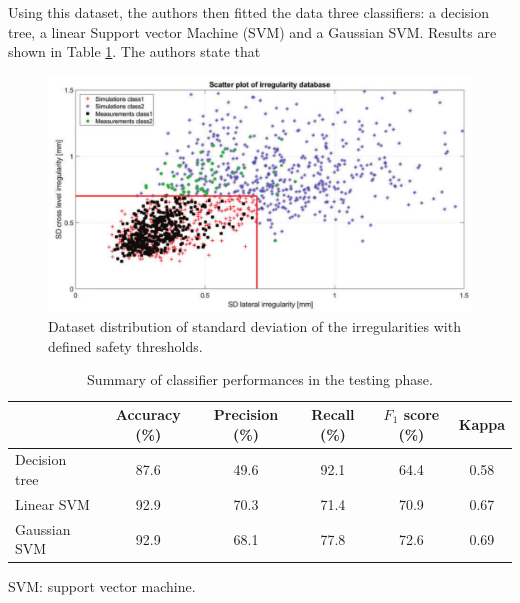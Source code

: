 Using this dataset, the authors then fitted the data three classifiers: a decision tree, a linear Support vector Machine (SVM) and a Gaussian SVM. Results are shown in Table \ref{Table:DeRosa-2021-Results}. The authors state that 

\begin{figure}[H]
    \centering
    \includegraphics[width=12cm]{Cap2_LitReview/Track_Quality_Accel/DeRosa (2021)/dataset.png}
    \caption{Dataset distribution of standard deviation of the irregularities with defined safety thresholds. \cite{DeRosa2021}}
    \label{fig:DeRosa-dataset}
\end{figure}

\begin{table}[ht]
\centering
\begin{tabular}{l c c c c c}
\hline
 & Accuracy (\%) & Precision (\%) & Recall (\%) & $F_1$ score (\%) & Kappa \\
\hline
Decision tree & 87.6 & 49.6 & 92.1 & 64.4 & 0.58 \\
Linear SVM & 92.9 & 70.3 & 71.4 & 70.9 & 0.67 \\
Gaussian SVM & 92.9 & 68.1 & 77.8 & 72.6 & 0.69 \\
\hline
\end{tabular}
\vspace{0.5em}
\small SVM: support vector machine.
\caption{Summary of classifier performances in the testing phase.}
\label{Table:DeRosa-2021-Results}
\end{table}


